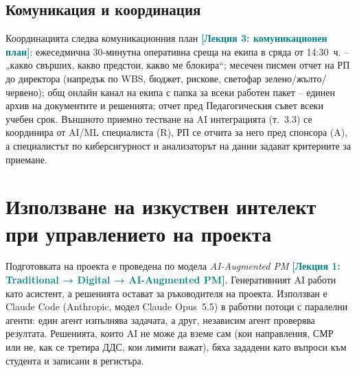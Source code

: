 \documentclass[11pt,a4paper]{article}
\newcommand{\lecturetag}[1]{\textcolor{teal}{\small\bfseries[#1]}}
\begin{document}
\subsection{Комуникация и координация}

Координацията следва комуникационния план \lecturetag{Лекция 3: комуникационен план}: ежеседмична 30-минутна оперативна среща на екипа в сряда от 14:30~ч. – „какво свърших, какво предстои, какво ме блокира“; месечен писмен отчет на РП до директора (напредък по WBS, бюджет, рискове, светофар зелено/жълто/червено); общ онлайн канал на екипа с папка за всеки работен пакет – единен архив на документите и решенията; отчет пред Педагогическия съвет всеки учебен срок. Външното приемно тестване на AI интеграцията (т.~3.3) се координира от AI/ML специалиста (R), РП се отчита за него пред спонсора (A), а специалистът по киберсигурност и анализаторът на данни задават критериите за приемане.

\clearpage%
\section{Използване на изкуствен интелект при управлението на проекта}

Подготовката на проекта е проведена по модела \emph{AI-Augmented PM} \lecturetag{Лекция 1: Traditional → Digital → AI-Augmented PM}. Генеративният AI работи като асистент, а решенията остават за ръководителя на проекта. Използван е Claude Code (Anthropic, модел Claude Opus~5.5) в работни потоци с паралелни агенти: един агент изпълнява задачата, а друг, независим агент проверява резултата. Решенията, които AI не може да вземе сам (кои направления, СМР или не, как се третира ДДС, кои лимити важат), бяха зададени като въпроси към студента и записани в регистъра.
\end{document}
